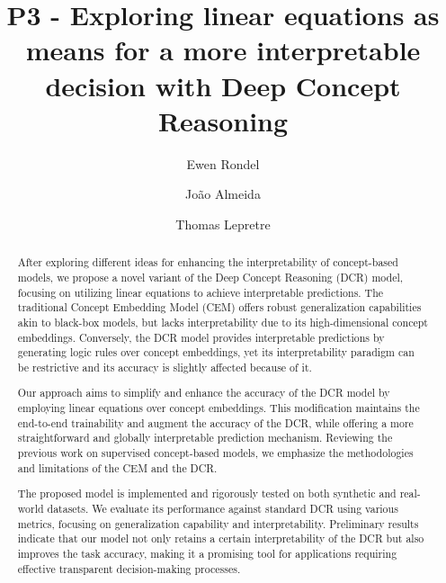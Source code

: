 \documentclass[sigconf, nonacm]{acmart}
\begin{document}
\title{P3 - Exploring linear equations as means for a more interpretable decision with Deep Concept Reasoning}


\author{Ewen Rondel}

\author{João Almeida}
\author{Thomas Lepretre}



\begin{abstract}
\vspace{2pt}
After exploring different ideas for enhancing the interpretability of concept-based models, we propose a novel variant of the Deep Concept Reasoning (DCR) model, focusing on utilizing linear equations to achieve interpretable predictions. The traditional Concept Embedding Model (CEM) offers robust generalization capabilities akin to black-box models, but lacks interpretability due to its high-dimensional concept embeddings. Conversely, the DCR model provides interpretable predictions by generating logic rules over concept embeddings, yet its interpretability paradigm can be restrictive and its accuracy is slightly affected because of it.

Our approach aims to simplify and enhance the accuracy of the DCR model by employing linear equations over concept embeddings. This modification maintains the end-to-end trainability and augment the accuracy of the DCR, while offering a more straightforward and globally interpretable prediction mechanism. Reviewing the previous work on supervised concept-based models, we emphasize the methodologies and limitations of the CEM and the DCR.

The proposed model is implemented and rigorously tested on both synthetic and real-world datasets. We evaluate its performance against standard DCR using various metrics, focusing on generalization capability and interpretability. Preliminary results indicate that our model not only retains a certain interpretability of the DCR but also improves the task accuracy, making it a promising tool for applications requiring effective transparent decision-making processes.
\end{abstract}
\end{document}
